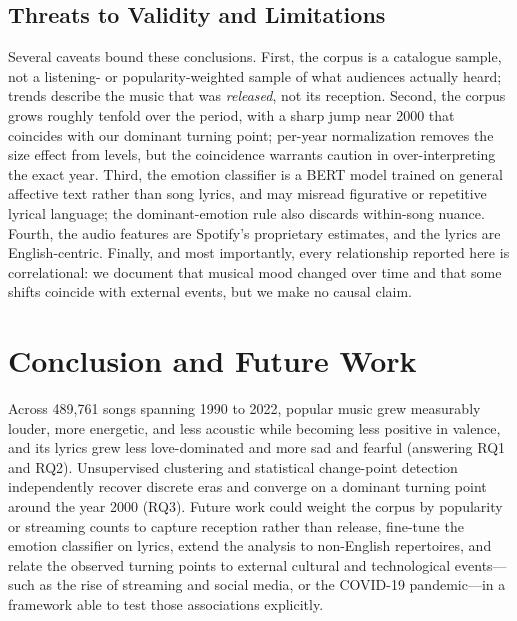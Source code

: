 \documentclass[conference]{IEEEtran}
\begin{document}
\subsection{Threats to Validity and Limitations}
Several caveats bound these conclusions. First, the corpus is a catalogue
sample, not a listening- or popularity-weighted sample of what audiences
actually heard; trends describe the music that was \emph{released}, not its
reception. Second, the corpus grows roughly tenfold over the period, with a
sharp jump near 2000 that coincides with our dominant turning point; per-year
normalization removes the size effect from levels, but the coincidence warrants
caution in over-interpreting the exact year. Third, the emotion classifier is a
BERT model trained on general affective text rather than song lyrics, and may
misread figurative or repetitive lyrical language; the dominant-emotion rule
also discards within-song nuance. Fourth, the audio features are Spotify's
proprietary estimates, and the lyrics are English-centric. Finally, and most
importantly, every relationship reported here is correlational: we document that
musical mood changed over time and that some shifts coincide with external
events, but we make no causal claim.

\section{Conclusion and Future Work}
Across 489{,}761 songs spanning 1990 to 2022, popular music grew measurably
louder, more energetic, and less acoustic while becoming less positive in
valence, and its lyrics grew less love-dominated and more sad and fearful
(answering RQ1 and RQ2). Unsupervised clustering and statistical change-point
detection independently recover discrete eras and converge on a dominant turning
point around the year 2000 (RQ3). Future work could weight the corpus by
popularity or streaming counts to capture reception rather than release,
fine-tune the emotion classifier on lyrics, extend the analysis to non-English
repertoires, and relate the observed turning points to external cultural and
technological events---such as the rise of streaming and social media, or the
COVID-19 pandemic---in a framework able to test those associations explicitly.
\end{document}
